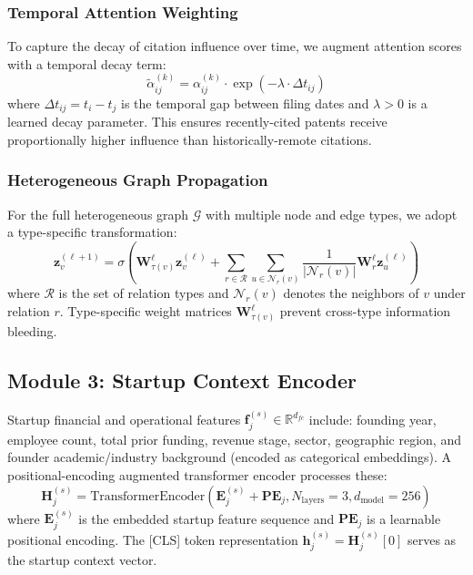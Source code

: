 \documentclass[journal]{IEEEtran}
\begin{document}
\subsubsection{Temporal Attention Weighting}

To capture the decay of citation influence over time, we augment attention scores with a temporal decay term:
\begin{equation}
    \tilde{\alpha}_{ij}^{(k)} = \alpha_{ij}^{(k)} \cdot \exp\!\left(-\lambda \cdot \Delta t_{ij}\right)
    \label{eq:temporal_attn}
\end{equation}
where $\Delta t_{ij} = t_i - t_j$ is the temporal gap between filing dates and $\lambda > 0$ is a learned decay parameter. This ensures recently-cited patents receive proportionally higher influence than historically-remote citations.

\subsubsection{Heterogeneous Graph Propagation}

For the full heterogeneous graph $\mathcal{G}$ with multiple node and edge types, we adopt a type-specific transformation:
\begin{equation}
    \mathbf{z}_v^{(\ell+1)} = \sigma\!\left(\mathbf{W}_{\tau(v)}^\ell \mathbf{z}_v^{(\ell)} + \sum_{r \in \mathcal{R}} \sum_{u \in \mathcal{N}_r(v)} \frac{1}{|\mathcal{N}_r(v)|} \mathbf{W}_r^\ell \mathbf{z}_u^{(\ell)}\right)
    \label{eq:het_prop}
\end{equation}
where $\mathcal{R}$ is the set of relation types and $\mathcal{N}_r(v)$ denotes the neighbors of $v$ under relation $r$. Type-specific weight matrices $\mathbf{W}_{\tau(v)}^\ell$ prevent cross-type information bleeding.

\subsection{Module 3: Startup Context Encoder}

Startup financial and operational features $\mathbf{f}_j^{(s)} \in \mathbb{R}^{d_{fc}}$ include: founding year, employee count, total prior funding, revenue stage, sector, geographic region, and founder academic/industry background (encoded as categorical embeddings). A positional-encoding augmented transformer encoder processes these:
\begin{equation}
    \mathbf{H}_j^{(s)} = \text{TransformerEncoder}(\mathbf{E}_j^{(s)} + \mathbf{PE}_j, N_{\text{layers}}=3, d_{\text{model}}=256)
    \label{eq:startup_enc}
\end{equation}
where $\mathbf{E}_j^{(s)}$ is the embedded startup feature sequence and $\mathbf{PE}_j$ is a learnable positional encoding. The [CLS] token representation $\mathbf{h}_j^{(s)} = \mathbf{H}_j^{(s)}[0]$ serves as the startup context vector.
\end{document}
